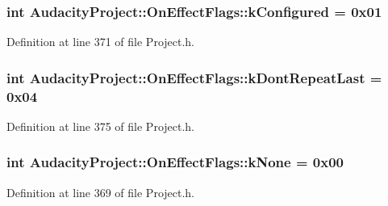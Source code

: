 \subsubsection[{\texorpdfstring{k\+Configured}{kConfigured}}]{ {\bf int} Audacity\+Project\+::\+On\+Effect\+Flags\+::k\+Configured = 0x01\hspace{0.3cm}{\ttfamily [static]}}\hypertarget{class_audacity_project_1_1_on_effect_flags_af853a6cb7bcf1ddf06f72337ec82f78a}{}\label{class_audacity_project_1_1_on_effect_flags_af853a6cb7bcf1ddf06f72337ec82f78a}


Definition at line 371 of file Project.\+h.

\subsubsection[{\texorpdfstring{k\+Dont\+Repeat\+Last}{kDontRepeatLast}}]{ {\bf int} Audacity\+Project\+::\+On\+Effect\+Flags\+::k\+Dont\+Repeat\+Last = 0x04\hspace{0.3cm}{\ttfamily [static]}}\hypertarget{class_audacity_project_1_1_on_effect_flags_a6cf87127ec3cfda797503acf90ab96f2}{}\label{class_audacity_project_1_1_on_effect_flags_a6cf87127ec3cfda797503acf90ab96f2}


Definition at line 375 of file Project.\+h.

\subsubsection[{\texorpdfstring{k\+None}{kNone}}]{ {\bf int} Audacity\+Project\+::\+On\+Effect\+Flags\+::k\+None = 0x00\hspace{0.3cm}{\ttfamily [static]}}\hypertarget{class_audacity_project_1_1_on_effect_flags_a8461cc6f7d62d8252c9651978c859f1d}{}\label{class_audacity_project_1_1_on_effect_flags_a8461cc6f7d62d8252c9651978c859f1d}


Definition at line 369 of file Project.\+h.

